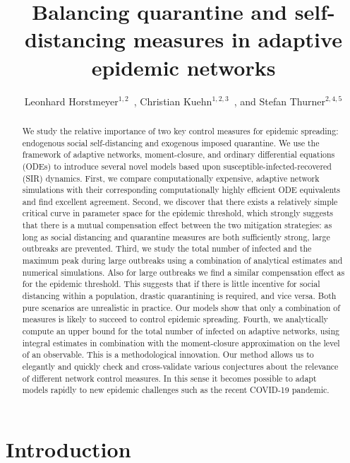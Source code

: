 \documentclass[12pt]{article}
\title{Balancing quarantine and self-distancing measures in adaptive epidemic networks}
\author{Leonhard Horstmeyer$^{1,2}$~, Christian Kuehn$^{1,2,3}$~, and Stefan Thurner$^{2,4,5}$}
\date{}
\begin{document}
\maketitle


\begin{abstract}
We study the relative importance of two key control measures for epidemic spreading: endogenous social self-distancing and exogenous imposed quarantine. We use the framework of adaptive networks, moment-closure, and ordinary differential equations (ODEs) to introduce several novel models based upon susceptible-infected-recovered (SIR) dynamics. First, we compare computationally expensive, adaptive network simulations with their corresponding computationally highly efficient ODE equivalents and find excellent agreement. Second, we discover that there exists a relatively simple critical curve in parameter space for the epidemic threshold, which strongly suggests that there is a mutual compensation effect between the two mitigation strategies: as long as social distancing and quarantine measures are both sufficiently strong,  large outbreaks are prevented. Third, we study the total number of infected and the maximum peak during large outbreaks using a combination of analytical estimates and numerical simulations. Also for large outbreaks we find a similar compensation effect as for the epidemic threshold. This suggests that if there is little incentive for social distancing within a population, drastic quarantining is required, and vice versa. Both pure scenarios are unrealistic in practice. Our models show that only a combination of measures is likely to succeed to control epidemic spreading. Fourth, we analytically compute an upper bound for the total number of infected on adaptive networks, using integral estimates in combination with the moment-closure approximation on the level of an observable. This is a methodological innovation. Our method allows us to elegantly and quickly check and cross-validate various conjectures about the relevance of different network control measures. In this sense it becomes possible to adapt models rapidly to new epidemic challenges such as the recent COVID-19 pandemic.  
\end{abstract}

\newpage
\section{Introduction}
\label{sec:intro}
\end{document}
